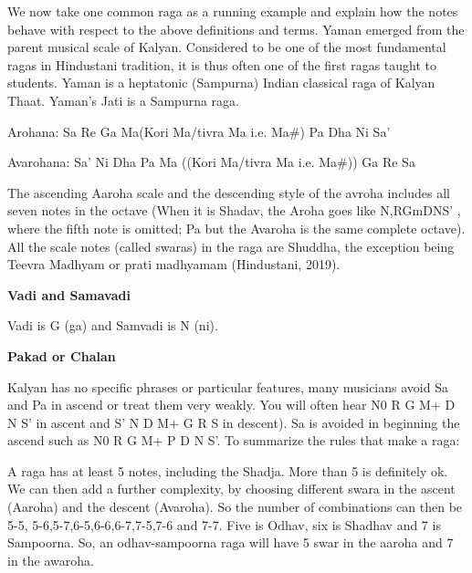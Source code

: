 We now take one common raga as a running example and explain how the notes behave with respect to the above definitions and terms. Yaman emerged from the parent musical scale of Kalyan. Considered to be one of the most fundamental ragas in Hindustani tradition, it is thus often one of the first ragas taught to students. Yaman is a heptatonic (Sampurna) Indian classical raga of Kalyan Thaat. Yaman's Jati is a Sampurna raga.
\par
Arohana: Sa Re Ga Ma(Kori Ma/tivra Ma i.e. Ma\#) Pa Dha Ni Sa'
\par
Avarohana: Sa' Ni Dha Pa Ma ((Kori Ma/tivra Ma i.e. Ma\#)) Ga Re Sa
\par
The ascending Aaroha scale and the descending style of the avroha includes all seven notes in the octave (When it is Shadav, the Aroha goes like N,RGmDNS' , where the fifth note is omitted; Pa but the Avaroha is the same complete octave). All the scale notes (called swaras) in the raga are Shuddha, the exception being Teevra Madhyam or prati madhyamam (Hindustani, 2019). 
\par
\begin{flushleft}
  \textbf{Vadi and Samavadi} \par
\end{flushleft}
Vadi is G (ga) and Samvadi is N (ni). \par
\begin{flushleft}
  \textbf{Pakad or Chalan} \par
\end{flushleft}
Kalyan has no specific phrases or particular features, many musicians avoid Sa and Pa in ascend or treat them very weakly. You will often hear N0 R G M+ D N S' in ascent and S' N D M+ G R S in descent). Sa is avoided in beginning the ascend such as N0 R G M+ P D N S'.
To summarize the rules that make a raga: \par
A raga has at least 5 notes, including the Shadja. More than 5 is definitely ok. We can then add a further complexity, by choosing different swara in the ascent (Aaroha) and the descent (Avaroha). So the number of combinations can then be 5-5, 5-6,5-7,6-5,6-6,6-7,7-5,7-6 and 7-7. Five is Odhav, six is Shadhav and 7 is Sampoorna. So, an odhav-sampoorna raga will have 5 swar in the aaroha and 7 in the awaroha.
